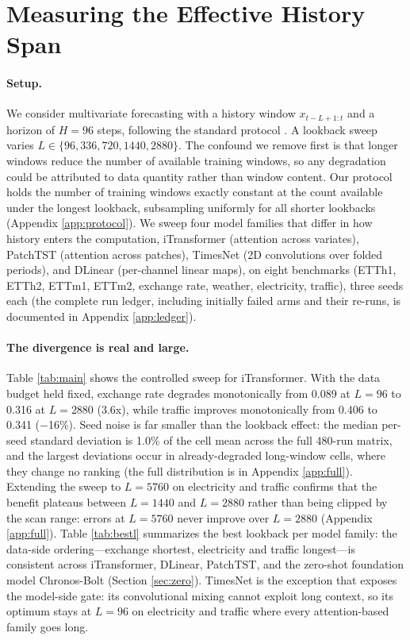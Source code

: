 \section{Measuring the Effective History Span}
\label{sec:measure}

\paragraph{Setup.}
We consider multivariate forecasting with a history window $x_{t-L+1:t}$ and a horizon of $H=96$ steps, following the standard protocol \citep{dlinear, itransformer}. A lookback sweep varies $L \in \{96, 336, 720, 1440, 2880\}$. The confound we remove first is that longer windows reduce the number of available training windows, so any degradation could be attributed to data quantity rather than window content. Our protocol holds the number of training windows exactly constant at the count available under the longest lookback, subsampling uniformly for all shorter lookbacks (Appendix \ref{app:protocol}). We sweep four model families that differ in how history enters the computation, iTransformer \citep{itransformer} (attention across variates), PatchTST \citep{patchtst} (attention across patches), TimesNet \citep{timesnet} (2D convolutions over folded periods), and DLinear \citep{dlinear} (per-channel linear maps), on eight benchmarks (ETTh1, ETTh2, ETTm1, ETTm2, exchange rate, weather, electricity, traffic), three seeds each (the complete run ledger, including initially failed arms and their re-runs, is documented in Appendix \ref{app:ledger}).



\paragraph{The divergence is real and large.}
Table \ref{tab:main} shows the controlled sweep for iTransformer. With the data budget held fixed, exchange rate degrades monotonically from 0.089 at $L{=}96$ to 0.316 at $L{=}2880$ (3.6x), while traffic improves monotonically from 0.406 to 0.341 ($-$16\%). Seed noise is far smaller than the lookback effect: the median per-seed standard deviation is 1.0\% of the cell mean across the full 480-run matrix, and the largest deviations occur in already-degraded long-window cells, where they change no ranking (the full distribution is in Appendix \ref{app:full}). Extending the sweep to $L{=}5760$ on electricity and traffic confirms that the benefit plateaus between $L{=}1440$ and $L{=}2880$ rather than being clipped by the scan range: errors at $L{=}5760$ never improve over $L{=}2880$ (Appendix \ref{app:full}). Table \ref{tab:bestl} summarizes the best lookback per model family: the data-side ordering---exchange shortest, electricity and traffic longest---is consistent across iTransformer, DLinear, PatchTST, and the zero-shot foundation model Chronos-Bolt \citep{chronos} (Section \ref{sec:zero}). TimesNet is the exception that exposes the model-side gate: its convolutional mixing cannot exploit long context, so its optimum stays at $L{=}96$ on electricity and traffic where every attention-based family goes long.

